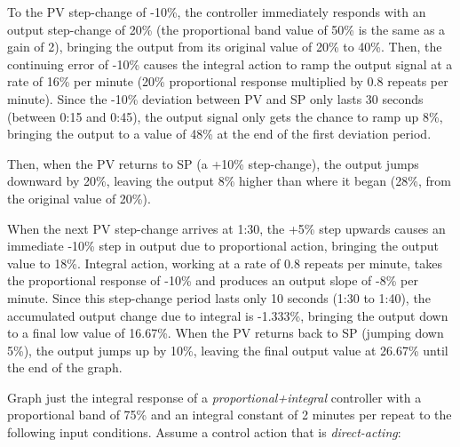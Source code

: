 To the PV step-change of -10\%, the controller immediately responds with an output step-change of 20\% (the proportional band value of 50\% is the same as a gain of 2), bringing the output from its original value of 20\% to 40\%.  Then, the continuing error of -10\% causes the integral action to ramp the output signal at a rate of 16\% per minute (20\% proportional response multiplied by 0.8 repeats per minute).  Since the -10\% deviation between PV and SP only lasts 30 seconds (between 0:15 and 0:45), the output signal only gets the chance to ramp up 8\%, bringing the output to a value of 48\% at the end of the first deviation period.

Then, when the PV returns to SP (a +10\% step-change), the output jumps downward by 20\%, leaving the output 8\% higher than where it began (28\%, from the original value of 20\%).

When the next PV step-change arrives at 1:30, the +5\% step upwards causes an immediate -10\% step in output due to proportional action, bringing the output value to 18\%.  Integral action, working at a rate of 0.8 repeats per minute, takes the proportional response of -10\% and produces an output slope of -8\% per minute.  Since this step-change period lasts only 10 seconds (1:30 to 1:40), the accumulated output change due to integral is -1.333\%, bringing the output down to a final low value of 16.67\%.  When the PV returns back to SP (jumping down 5\%), the output jumps up by 10\%, leaving the final output value at 26.67\% until the end of the graph.













Graph just the integral response of a {\it proportional+integral} controller with a proportional band of 75\% and an integral constant of 2 minutes per repeat to the following input conditions.  Assume a control action that is {\it direct-acting}:

